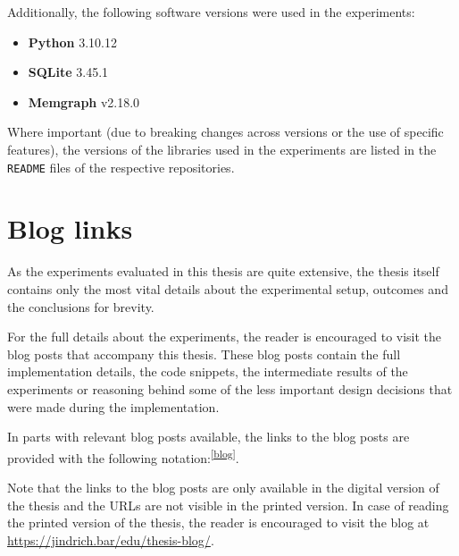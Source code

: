 Additionally, the following software versions were used in the experiments:

\begin{itemize}
    \item \textbf{Python} 3.10.12
    \item \textbf{SQLite} 3.45.1
    \item \textbf{Memgraph} v2.18.0
\end{itemize}

Where important (due to breaking changes across versions or the use of specific features), 
the versions of the libraries used in the experiments are listed in the \texttt{README} files of the respective repositories.

\section*{Blog links}
As the experiments evaluated in this thesis are quite extensive, 
the thesis itself contains only the most vital details about the experimental setup, outcomes and the conclusions for brevity.

For the full details about the experiments, the reader is encouraged to visit the blog posts that accompany this thesis.
These blog posts contain the full implementation details, the code snippets, the intermediate results of the experiments
or reasoning behind some of the less important design decisions that were made during the implementation.

In parts with relevant blog posts available, the links to the blog posts are provided with the following notation:\textsuperscript{\href{https://barjin.github.io/edu/thesis-blog/}{[blog]}}.

Note that the links to the blog posts are only available in the digital version of the thesis and the URLs are not visible in the printed version.
In case of reading the printed version of the thesis, the reader is encouraged to visit the blog at \url{https://jindrich.bar/edu/thesis-blog/}.